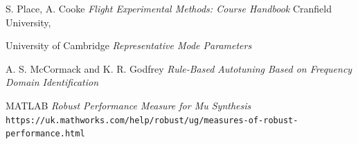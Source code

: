 \documentclass{article}
\begin{document}
\begin{thebibliography}{9}

    S. Place, A. Cooke
    \emph{Flight Experimental Methods: Course Handbook}
    Cranfield University,

    University of Cambridge
    \emph{Representative Mode Parameters}

    A. S. McCormack and K. R. Godfrey
    \emph{Rule-Based Autotuning Based on Frequency Domain Identification}

    MATLAB
    \emph{Robust Performance Measure for Mu Synthesis}
    \texttt{https://uk.mathworks.com/help/robust/ug/measures-of-robust-performance.html}
    

\end{thebibliography}
\end{document}
